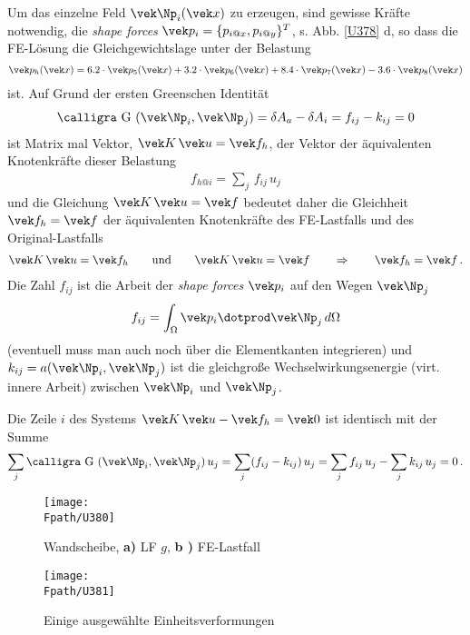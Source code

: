 Um das einzelne Feld $\vek \Np_i(\vek x)$ zu erzeugen, sind gewisse Kr\"{a}fte notwendig, die {\em shape forces\/} $\vek p_i = \{p_{i @x},p_{i @y}\}^T$, s. Abb. \ref{U378} d, so dass die FE-L\"{o}sung die Gleichgewichtslage unter der Belastung
 \begin{align}
\vek p_h(\vek x) = 6.2\cdot\vek p_5(\vek x) + 3.2\cdot\vek p_6(\vek x) +8.4\cdot\vek p_7(\vek x) -3.6\cdot\vek p_8(\vek x)
\end{align}
ist. Auf Grund der ersten Greenschen Identit\"{a}t
\begin{align}
\text{\normalfont\calligra G\,\,}(\vek \Np_i,\vek  \Np_j) =  \delta A_a - \delta A_i = f_{ij} - k_{ij }= 0
\end{align}
ist Matrix mal Vektor, $\vek K\,\vek u = \vek f_h$, der Vektor der \"{a}quivalenten Knotenkr\"{a}fte dieser Belastung
\begin{align}
f_{h @i} = \sum_j\,f_{ij}\,u_j
\end{align}
 und die Gleichung $\vek K\,\vek u = \vek f$  bedeutet daher die Gleichheit $\vek f_h = \vek f$ der \"{a}quivalenten Knotenkr\"{a}fte des FE-Lastfalls und des Original-Lastfalls
 \begin{align}
 \vek K\,\vek u = \vek f_h \qquad \text{und} \qquad\vek K\,\vek u = \vek f \qquad \Rightarrow \qquad \vek f_h = \vek f\,.
 \end{align}
 Die Zahl $f_{ij}$ ist die Arbeit der {\em shape forces\/} $\vek p_i$ auf den Wegen $\vek \Np_j$
 \begin{align}
 f_{ij} = \int_{\Omega} \vek p_i \dotprod \vek \Np_j\,d\Omega
 \end{align}
 (eventuell muss man auch noch \"{u}ber die Elementkanten integrieren)  und $k_{ij} = a(\vek \Np_i, \vek \Np_j)$ ist die gleichgro{\ss}e Wechselwirkungsenergie (virt. innere Arbeit) zwischen $\vek \Np_i$ und $\vek \Np_j$.

 Die Zeile $i$ des Systems $\vek K\,\vek u - \vek f_h = \vek 0$ ist identisch mit der Summe
 \begin{align}
\sum_j \text{\normalfont\calligra G\,\,}(\vek \Np_i,\vek  \Np_j) \,u_j = \sum_j  ( f_{ij} - k_{ij }) \, u_j= \sum_j f_{ij}\,u_j - \sum_j k_{ij } \, u_j = 0\,.
 \end{align}

\begin{figure}[tbp]
\centering
\if {} \sidecaption \fi
\texttt{[image: \\Fpath/U380]}
\caption{Wandscheibe, \textbf{ a)} LF $g$, \textbf{b )} FE-Lastfall}
\label{U380}%
\end{figure}%
\begin{figure}[tbp]
\centering
\if {} \sidecaption \fi
\texttt{[image: \\Fpath/U381]}
\caption{Einige ausgew\"{a}hlte Einheitsverformungen}
\label{U381}%
\end{figure}%

